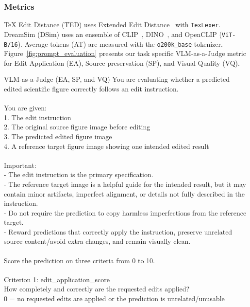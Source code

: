 \subsubsection{Metrics}
\label{subsubsec:Metrics}
TeX Edit Distance (TED) uses Extended Edit Distance~\citep{kusner2015icml-word} with \texttt{TexLexer}. DreamSim (DSim) uses an ensemble of CLIP~\citep{radford2021learning}, DINO~\citep{caron2021emerging}, and OpenCLIP (\texttt{ViT-B/16}). Average tokens (AT) are measured with the \texttt{o200k\_base} tokenizer. Figure~\ref{fig:prompt_evaluation} presents our task specific VLM-as-a-Judge metric for Edit Application (EA), Source preservation (SP), and Visual Quality (VQ).
\begin{PromptBox}{VLM-as-a-Judge (EA, SP, and VQ)}
You are evaluating whether a predicted edited scientific figure correctly follows an edit instruction. \\\\
You are given: \\
1. The edit instruction \\
2. The original source figure image before editing \\
3. The predicted edited figure image \\
4. A reference target figure image showing one intended edited result \\\\
Important: \\
- The edit instruction is the primary specification. \\
- The reference target image is a helpful guide for the intended result, but it may contain minor artifacts, imperfect alignment, or details not fully described in the instruction. \\
- Do not require the prediction to copy harmless imperfections from the reference target. \\
- Reward predictions that correctly apply the instruction, preserve unrelated source content/avoid extra changes, and remain visually clean. \\\\
Score the prediction on three criteria from 0 to 10. \\\\
Criterion 1: edit\_application\_score \\
How completely and correctly are the requested edits applied? \\
0 = no requested edits are applied or the prediction is unrelated/unusable \\

\end{PromptBox}

